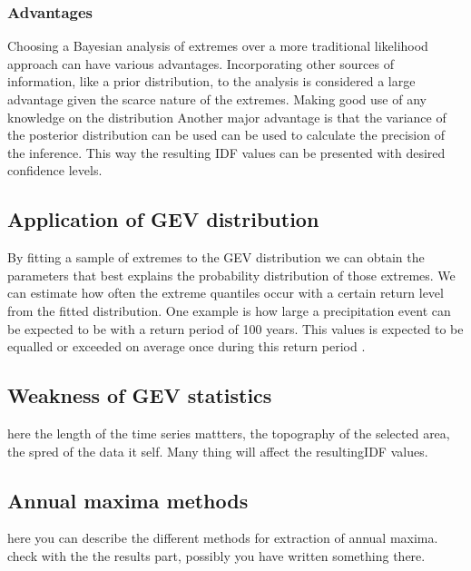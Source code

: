 \subsubsection{Advantages}
Choosing a Bayesian analysis of extremes over a more traditional likelihood approach can have various advantages. Incorporating other sources of information, like a prior distribution, to the analysis is considered a large advantage given the scarce nature of the extremes. Making good use of any knowledge on the distribution Another major advantage is that the variance of the posterior distribution can be used can be used to calculate the precision of the inference. This way the resulting IDF values can be presented with desired confidence levels.   




\subsection{Application of GEV distribution}
By fitting a sample of extremes to the GEV distribution we can obtain the parameters that best explains the probability distribution of those extremes. We can estimate how often the extreme quantiles occur with a certain return level from the fitted distribution. One example is how large a precipitation event can be expected to be with a return period of 100 years. This values is expected to be equalled or exceeded on average once during this return period \cite{gmao}.

\subsection{Weakness of GEV statistics}

here the length of the time series mattters, the topography of the selected area, the spred of the data it self. Many thing will affect the resultingIDF values. 

\subsection{Annual maxima methods}

here you can describe the different methods for extraction of annual maxima. check with the the results part, possibly you have written something there.   